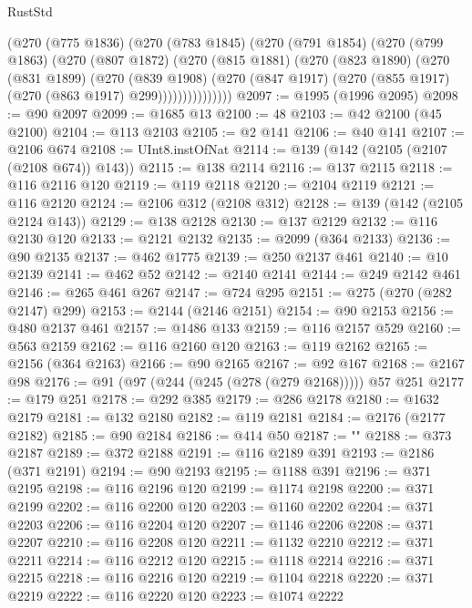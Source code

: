 \begin{lexlean}{RustStd}
\begin{coremodule}
          (@270
            (@775 @1836)
            (@270
              (@783 @1845)
              (@270
                (@791 @1854)
                (@270
                  (@799 @1863)
                  (@270
                    (@807 @1872)
                    (@270
                      (@815 @1881)
                      (@270
                        (@823 @1890)
                        (@270
                          (@831 @1899)
                          (@270
                            (@839 @1908)
                            (@270
                              (@847 @1917)
                              (@270 (@855 @1917) (@270 (@863 @1917) @299)))))))))))))))
@2097 := @1995 (@1996 @2095)
@2098 := @90 @2097
@2099 := @1685 @13
@2100 := 48
@2103 := @42 @2100 (@45 @2100)
@2104 := @113 @2103
@2105 := @2 @141
@2106 := @40 @141
@2107 := @2106 @674
@2108 := UInt8.instOfNat
@2114 := @139 (@142 (@2105 (@2107 (@2108 @674)) @143))
@2115 := @138 @2114
@2116 := @137 @2115
@2118 := @116 @2116 @120
@2119 := @119 @2118
@2120 := @2104 @2119
@2121 := @116 @2120
@2124 := @2106 @312 (@2108 @312)
@2128 := @139 (@142 (@2105 @2124 @143))
@2129 := @138 @2128
@2130 := @137 @2129
@2132 := @116 @2130 @120
@2133 := @2121 @2132
@2135 := @2099 (@364 @2133)
@2136 := @90 @2135
@2137 := @462 @1775
@2139 := @250 @2137 @461
@2140 := @10 @2139
@2141 := @462 @52
@2142 := @2140 @2141
@2144 := @249 @2142 @461
@2146 := @265 @461 @267
@2147 := @724 @295
@2151 := @275 (@270 (@282 @2147) @299)
@2153 := @2144 (@2146 @2151)
@2154 := @90 @2153
@2156 := @480 @2137 @461
@2157 := @1486 @133
@2159 := @116 @2157 @529
@2160 := @563 @2159
@2162 := @116 @2160 @120
@2163 := @119 @2162
@2165 := @2156 (@364 @2163)
@2166 := @90 @2165
@2167 := @92 @167
@2168 := @2167 @98
@2176 := @91 (@97 (@244 (@245 (@278 (@279 @2168))))) @57 @251
@2177 := @179 @251
@2178 := @292 @385
@2179 := @286 @2178
@2180 := @1632 @2179
@2181 := @132 @2180
@2182 := @119 @2181
@2184 := @2176 (@2177 @2182)
@2185 := @90 @2184
@2186 := @414 @50
@2187 := ""
@2188 := @373 @2187
@2189 := @372 @2188
@2191 := @116 @2189 @391
@2193 := @2186 (@371 @2191)
@2194 := @90 @2193
@2195 := @1188 @391
@2196 := @371 @2195
@2198 := @116 @2196 @120
@2199 := @1174 @2198
@2200 := @371 @2199
@2202 := @116 @2200 @120
@2203 := @1160 @2202
@2204 := @371 @2203
@2206 := @116 @2204 @120
@2207 := @1146 @2206
@2208 := @371 @2207
@2210 := @116 @2208 @120
@2211 := @1132 @2210
@2212 := @371 @2211
@2214 := @116 @2212 @120
@2215 := @1118 @2214
@2216 := @371 @2215
@2218 := @116 @2216 @120
@2219 := @1104 @2218
@2220 := @371 @2219
@2222 := @116 @2220 @120
@2223 := @1074 @2222

\end{coremodule}
\end{lexlean}
